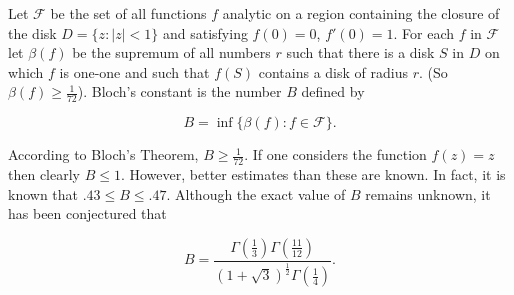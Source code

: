 Let $\mathcal{F}$ be the set of all functions $f$ analytic on a region containing the closure of the disk $D = \{z: |z| < 1\}$ and satisfying $f(0) = 0$, $f'(0) = 1$. For each $f$ in $\mathcal{F}$ let $\beta(f)$ be the supremum of all numbers $r$ such that there is a disk $S$ in $D$ on which $f$ is one-one and such that $f(S)$ contains a disk of radius $r$. (So $\beta(f) \geq \frac{1}{72}$). Bloch's constant is the number $B$ defined by

$$B = \inf \{ \beta(f) : f \in \mathcal{F} \}.$$

According to Bloch's Theorem, $B \geq \frac{1}{72}$. If one considers the function $f(z) = z$ then clearly $B \leq 1$. However, better estimates than these are known. In fact, it is known that $.43 \leq B \leq .47$. Although the exact value of $B$ remains unknown, it has been conjectured that

$$B = \frac{\Gamma\left(\frac{1}{3}\right) \Gamma\left(\frac{11}{12}\right)}{(1 + \sqrt{3})^{\frac{1}{2}} \Gamma\left(\frac{1}{4}\right)}.$$
